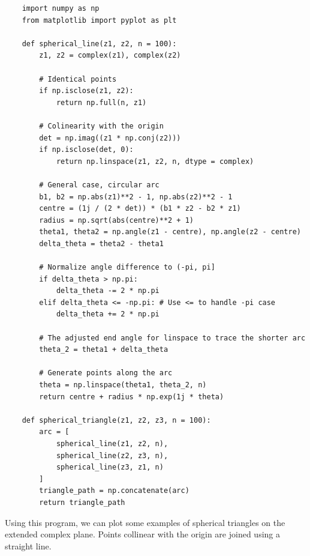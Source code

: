 \documentclass{article}
\begin{document}
\begin{verbatim}
    import numpy as np
    from matplotlib import pyplot as plt
    
    def spherical_line(z1, z2, n = 100):
        z1, z2 = complex(z1), complex(z2)
    
        # Identical points
        if np.isclose(z1, z2):
            return np.full(n, z1)
    
        # Colinearity with the origin
        det = np.imag((z1 * np.conj(z2)))
        if np.isclose(det, 0):
            return np.linspace(z1, z2, n, dtype = complex)
            
        # General case, circular arc
        b1, b2 = np.abs(z1)**2 - 1, np.abs(z2)**2 - 1
        centre = (1j / (2 * det)) * (b1 * z2 - b2 * z1)
        radius = np.sqrt(abs(centre)**2 + 1)
        theta1, theta2 = np.angle(z1 - centre), np.angle(z2 - centre)
        delta_theta = theta2 - theta1
    
        # Normalize angle difference to (-pi, pi]
        if delta_theta > np.pi:
            delta_theta -= 2 * np.pi
        elif delta_theta <= -np.pi: # Use <= to handle -pi case 
            delta_theta += 2 * np.pi
    
        # The adjusted end angle for linspace to trace the shorter arc
        theta_2 = theta1 + delta_theta
    
        # Generate points along the arc
        theta = np.linspace(theta1, theta_2, n)
        return centre + radius * np.exp(1j * theta)
    
    def spherical_triangle(z1, z2, z3, n = 100):
        arc = [
            spherical_line(z1, z2, n), 
            spherical_line(z2, z3, n), 
            spherical_line(z3, z1, n)
        ]
        triangle_path = np.concatenate(arc)
        return triangle_path
\end{verbatim}

Using this program, we can plot some examples of spherical triangles on the extended complex plane. Points collinear with the origin are joined using a straight line.
\end{document}
